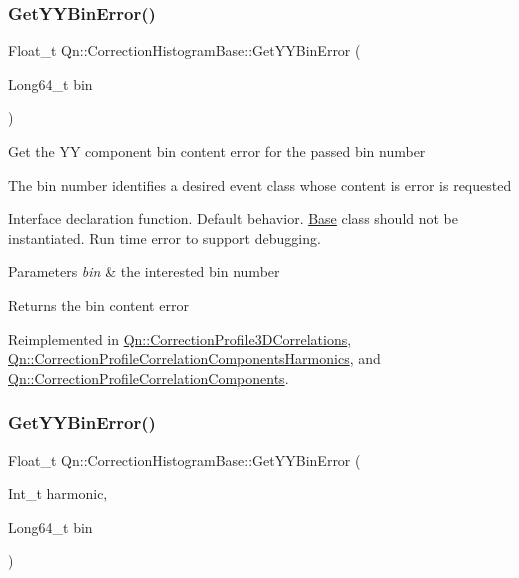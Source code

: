 \subsubsection{\texorpdfstring{Get\+Y\+Y\+Bin\+Error()}{GetYYBinError()}\hspace{0.1cm}{\footnotesize\ttfamily [1/2]}}
{\footnotesize\ttfamily Float\+\_\+t Qn\+::\+Correction\+Histogram\+Base\+::\+Get\+Y\+Y\+Bin\+Error (\begin{DoxyParamCaption}\item[{Long64\+\_\+t}]{bin }\end{DoxyParamCaption})\hspace{0.3cm}{\ttfamily [virtual]}}

Get the YY component bin content error for the passed bin number

The bin number identifies a desired event class whose content is error is requested

Interface declaration function. Default behavior. \mbox{\hyperlink{classBase}{Base}} class should not be instantiated. Run time error to support debugging.


\begin{DoxyParams}{Parameters}
{\em bin} & the interested bin number \\
\hline
\end{DoxyParams}
\begin{DoxyReturn}{Returns}
the bin content error 
\end{DoxyReturn}


Reimplemented in \mbox{\hyperlink{classQn_1_1CorrectionProfile3DCorrelations_a02c551ac645a7b5a3f2413a7ccb8985a}{Qn\+::\+Correction\+Profile3\+D\+Correlations}}, \mbox{\hyperlink{classQn_1_1CorrectionProfileCorrelationComponentsHarmonics_a2c790c78673796616e18bc1f793a6f1e}{Qn\+::\+Correction\+Profile\+Correlation\+Components\+Harmonics}}, and \mbox{\hyperlink{classQn_1_1CorrectionProfileCorrelationComponents_a4952dd516dbd12a66c7a385cbc51cc6b}{Qn\+::\+Correction\+Profile\+Correlation\+Components}}.

\mbox{\label{classQn_1_1CorrectionHistogramBase_a3ea1dbffee549c8cedb8926c34e46c77}} 
\subsubsection{\texorpdfstring{Get\+Y\+Y\+Bin\+Error()}{GetYYBinError()}\hspace{0.1cm}{\footnotesize\ttfamily [2/2]}}
{\footnotesize\ttfamily Float\+\_\+t Qn\+::\+Correction\+Histogram\+Base\+::\+Get\+Y\+Y\+Bin\+Error (\begin{DoxyParamCaption}\item[{Int\+\_\+t}]{harmonic,  }\item[{Long64\+\_\+t}]{bin }\end{DoxyParamCaption})\hspace{0.3cm}{\ttfamily [virtual]}}

